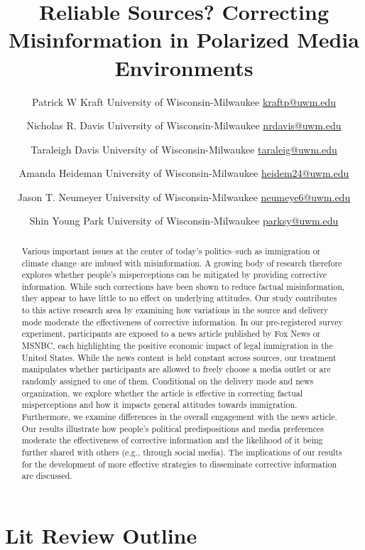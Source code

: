\documentclass[11pt,article,oneside]{memoir}
\title{\bigskip \bigskip Reliable Sources? Correcting Misinformation in
Polarized Media Environments}
\author{
      \Large Patrick W Kraft \newline
    \footnotesize University of Wisconsin-Milwaukee \newline
    \footnotesize \url{kraftp@uwm.edu}\vspace*{1.1em}\newline 
     \and 
      \Large Nicholas R. Davis \newline
    \footnotesize University of Wisconsin-Milwaukee \newline
    \footnotesize \url{nrdavis@uwm.edu}\vspace*{1.1em}\newline 
     \and 
      \Large Taraleigh Davis \newline
    \footnotesize University of Wisconsin-Milwaukee \newline
    \footnotesize \url{taraleig@uwm.edu}\vspace*{1.1em}\newline 
     \and 
      \Large Amanda Heideman \newline
    \footnotesize University of Wisconsin-Milwaukee \newline
    \footnotesize \url{heidem24@uwm.edu}\vspace*{1.1em}\newline 
     \and 
      \Large Jason T. Neumeyer \newline
    \footnotesize University of Wisconsin-Milwaukee \newline
    \footnotesize \url{neumeye6@uwm.edu}\vspace*{1.1em}\newline 
     \and 
      \Large Shin Young Park \newline
    \footnotesize University of Wisconsin-Milwaukee \newline
    \footnotesize \url{parksy@uwm.edu}\vspace*{1.1em}\newline 
    }
\date{}
\begin{document}
{}



\pagestyle{ath} 



\maketitle


\begin{abstract}
\noindent Various important issues at the center of today's
politics--such as immigration or climate change--are imbued with
misinformation. A growing body of research therefore explores whether
people's misperceptions can be mitigated by providing corrective
information. While such corrections have been shown to reduce factual
misinformation, they appear to have little to no effect on underlying
attitudes. Our study contributes to this active research area by
examining how variations in the source and delivery mode moderate the
effectiveness of corrective information. In our pre-registered survey
experiment, participants are exposed to a news article published by Fox
News or MSNBC, each highlighting the positive economic impact of legal
immigration in the United States. While the news content is held
constant across sources, our treatment manipulates whether participants
are allowed to freely choose a media outlet or are randomly assigned to
one of them. Conditional on the delivery mode and news organization, we
explore whether the article is effective in correcting factual
misperceptions and how it impacts general attitudes towards immigration.
Furthermore, we examine differences in the overall engagement with the
news article. Our results illustrate how people's political
predispositions and media preferences moderate the effectiveness of
corrective information and the likelihood of it being further shared
with others (e.g., through social media). The implications of our
results for the development of more effective strategies to disseminate
corrective information are discussed.
\bigskip
\end{abstract}



\hypertarget{lit-review-outline}{%
\section{Lit Review Outline}\label{lit-review-outline}}
\end{document}
